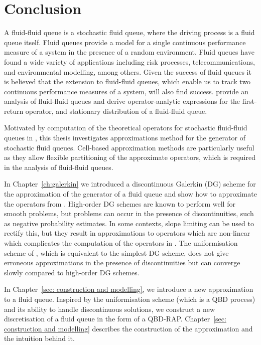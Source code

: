 \chapter{Conclusion\label{ch: conclusion}} 
A fluid-fluid queue is a stochastic fluid queue, where the driving process is a fluid queue itself. Fluid queues provide a model for a single continuous performance measure of a system in the presence of a random environment. Fluid queues have found a wide variety of applications including risk processes, telecommunications, and environmental modelling, among others. Given the success of fluid queues it is believed that the extension to fluid-fluid queues, which enable us to track two continuous performance measures of a system, will also find success. \cite{bo2014} provide an analysis of fluid-fluid queues and derive operator-analytic expressions for the first-return operator, and stationary distribution of a fluid-fluid queue.

Motivated by computation of the theoretical operators for stochastic fluid-fluid queues in \cite{bo2014}, this thesis investigates approximations method for the generator of stochastic fluid queues. Cell-based approximation methods are particularly useful as they allow flexible partitioning of the approximate operators, which is required in the analysis of fluid-fluid queues. 

In Chapter~\ref{ch:galerkin} we introduced a discontinuous Galerkin (DG) scheme for the approximation of the generator of a fluid queue and show how to approximate the operators from \cite{bo2014}. High-order DG schemes are known to perform well for smooth problems, but problems can occur in the presence of discontinuities, such as negative probability estimates. In some contexts, slope limiting can be used to rectify this, but they result in approximations to operators which are non-linear which complicates the computation of the operators in \cite{bo2014}. The uniformisation scheme of \cite{bo2013}, which is equivalent to the simplest DG scheme, does not give erroneous approximations in the presence of discontinuities but can converge slowly compared to high-order DG schemes. 

In Chapter~\ref{sec: construction and modelling}, we introduce a new approximation to a fluid queue. Inspired by the uniformisation scheme (which is a QBD process) and its ability to handle discontinuous solutions, we construct a new discretisation of a fluid queue in the form of a QBD-RAP. Chapter~\ref{sec: construction and modelling} describes the construction of the approximation and the intuition behind it. 

